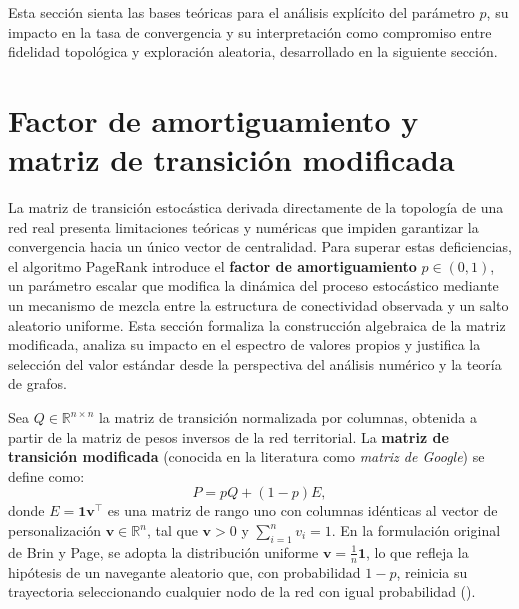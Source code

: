 \documentclass[
  spanish,
  us-letterpaper,
]{scrreprt}
\numberwithin{equation}{section}
\begin{document}
Esta sección sienta las bases teóricas para el análisis explícito del
parámetro \(p\), su impacto en la tasa de convergencia y su
interpretación como compromiso entre fidelidad topológica y exploración
aleatoria, desarrollado en la siguiente sección.

\section{Factor de amortiguamiento y matriz de transición
modificada}\label{factor-de-amortiguamiento-y-matriz-de-transiciuxf3n-modificada}

La matriz de transición estocástica derivada directamente de la
topología de una red real presenta limitaciones teóricas y numéricas que
impiden garantizar la convergencia hacia un único vector de centralidad.
Para superar estas deficiencias, el algoritmo PageRank introduce el
\textbf{factor de amortiguamiento} \(p \in (0,1)\), un parámetro escalar
que modifica la dinámica del proceso estocástico mediante un mecanismo
de mezcla entre la estructura de conectividad observada y un salto
aleatorio uniforme. Esta sección formaliza la construcción algebraica de
la matriz modificada, analiza su impacto en el espectro de valores
propios y justifica la selección del valor estándar desde la perspectiva
del análisis numérico y la teoría de grafos.

Sea \(Q \in \mathbb{R}^{n \times n}\) la matriz de transición
normalizada por columnas, obtenida a partir de la matriz de pesos
inversos de la red territorial. La \textbf{matriz de transición
modificada} (conocida en la literatura como \emph{matriz de Google}) se
define como: \[
P = pQ + (1-p)E,
\] donde \(E = \mathbf{1}\mathbf{v}^\top\) es una matriz de rango uno
con columnas idénticas al vector de personalización
\(\mathbf{v} \in \mathbb{R}^n\), tal que \(\mathbf{v} > 0\) y
\(\sum_{i=1}^n v_i = 1\). En la formulación original de Brin y Page, se
adopta la distribución uniforme \(\mathbf{v} = \frac{1}{n}\mathbf{1}\),
lo que refleja la hipótesis de un navegante aleatorio que, con
probabilidad \(1-p\), reinicia su trayectoria seleccionando cualquier
nodo de la red con igual probabilidad
().
\end{document}
